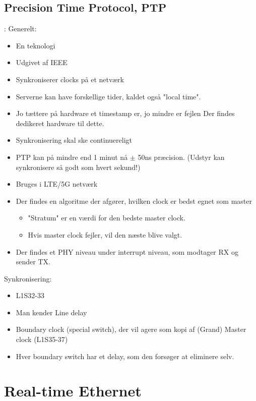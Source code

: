 \documentclass[oneside, 10pt]{article}
\begin{document}
\subsection{Precision Time Protocol, PTP}:
Generelt:
\begin{itemize}
	\item En teknologi
	\item Udgivet af IEEE
	\item Synkroniserer clocks på et netværk
	\item Serverne kan have forskellige tider, kaldet også "local time".
	\item Jo tættere på hardware et timestamp er, jo mindre er fejlen
	\subitem Der findes dedikeret hardware til dette.
	\item Synkronisering skal ske continuereligt
	\item PTP kan på mindre end 1 minut nå $\pm$ 50ns præcision. (Udstyr kan synkronisere så godt som hvert sekund!)
	\item Bruges i LTE/5G netværk
	\item Der findes en algoritme der afgører, hvilken clock er bedst egnet som master
	\begin{itemize}
	 	\item "Stratum" er en værdi for den bedste master clock.
	 	\item Hvis master clock fejler, vil den næste blive valgt.
	 \end{itemize} 
	 \item Der findes et PHY niveau under interrupt niveau, som modtager RX og sender TX.
\end{itemize}

Synkronisering:
\begin{itemize}
	\item L1S32-33
	\item Man kender Line delay
	\item Boundary clock (special switch), der vil agere som kopi af (Grand) Master clock (L1S35-37)
	\item Hver boundary switch har et delay, som den forsøger at eliminere selv.
\end{itemize}







\newpage
\section{Real-time Ethernet}
\end{document}
